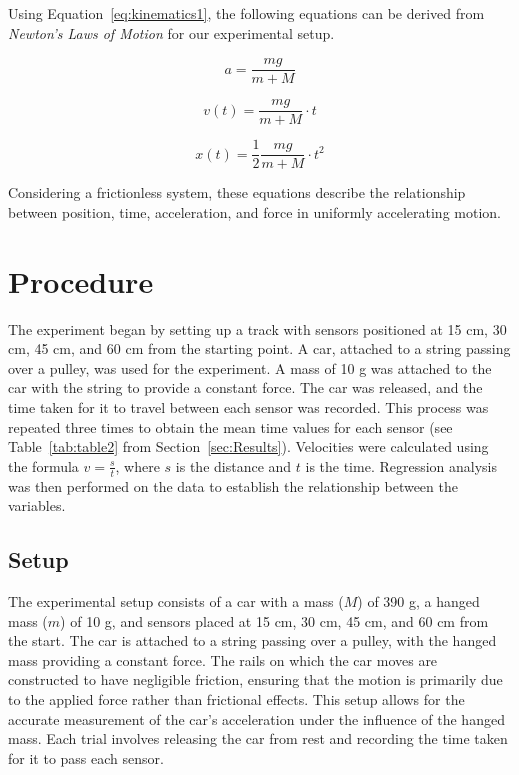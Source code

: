 \documentclass[twocolumn]{article}
\begin{document}
Using Equation~\ref{eq:kinematics1}, the following equations can be derived from \textit{Newton's Laws of Motion} for our experimental setup.

\begin{equation}
a=\frac{mg}{m+M }
\label{eq:a}
\end{equation}

\begin{equation}
v(t)=\frac{mg}{m+M}\cdot t
\label{eq:v_t_mass}
\end{equation}

\begin{equation}
x(t)=\frac{1}{2}\frac{mg}{m+M}\cdot t^{2}
\end{equation}

Considering a frictionless system, these equations describe the relationship between position, time, acceleration, and force in uniformly accelerating motion.

\section{Procedure}

The experiment began by setting up a track with sensors positioned at 15 cm, 30 cm, 45 cm, and 60 cm from the starting point. A car, attached to a string passing over a pulley, was used for the experiment. A mass of 10 g was attached to the car with the string to provide a constant force. The car was released, and the time taken for it to travel between each sensor was recorded. This process was repeated three times to obtain the mean time values for each sensor (see Table~\ref{tab:table2} from Section~\ref{sec:Results}). Velocities were calculated using the formula \(v = \frac{s}{t}\), where \(s\) is the distance and \(t\) is the time. Regression analysis was then performed on the data to establish the relationship between the variables.

\subsection{Setup}

The experimental setup consists of a car with a mass ($M$) of 390 g, a hanged mass ($m$) of 10 g, and sensors placed at 15 cm, 30 cm, 45 cm, and 60 cm from the start. The car is attached to a string passing over a pulley, with the hanged mass providing a constant force. The rails on which the car moves are constructed to have negligible friction, ensuring that the motion is primarily due to the applied force rather than frictional effects. This setup allows for the accurate measurement of the car's acceleration under the influence of the hanged mass. Each trial involves releasing the car from rest and recording the time taken for it to pass each sensor. 
\end{document}

